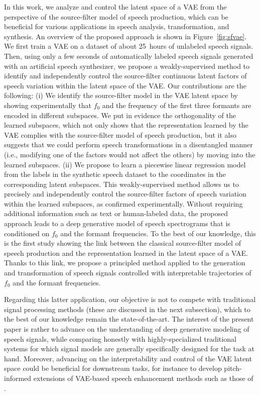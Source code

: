 \documentclass[review]{elsarticle}
\begin{document}
In this work, we analyze and control the latent space of a VAE from the perspective of the source-filter model of speech production, which can be beneficial for various applications in speech analysis, transformation, and synthesis. An overview of the proposed approach is shown in Figure~\ref{fig:sfvae}. We first train a VAE on a dataset of about 25~hours of unlabeled speech signals. Then, using only a few seconds of automatically labeled speech signals generated with an artificial speech synthesizer, we propose a weakly-supervised method to identify and independently control the source-filter continuous latent factors of speech variation within the latent space of the VAE. Our contributions are the following: (i) We identify the source-filter model in the VAE latent space by showing experimentally that $f_0$ and the frequency of the first three formants are encoded in different subspaces. We put in evidence the orthogonality of the learned subspaces, which not only shows that the representation learned by the VAE complies with the source-filter model of speech production, but it also suggests that we could perform speech transformations in a disentangled manner (i.e., modifying one of the factors would not affect the others) by moving into the learned subspaces. (ii) We propose to learn a piecewise linear regression model from the labels in the synthetic speech dataset to the coordinates in the corresponding latent subspaces. This weakly-supervised method allows us to precisely and independently control the source-filter factors of speech variation within the learned subspaces, as confirmed experimentally. Without requiring additional information such as text or human-labeled data, the proposed approach leads to a deep generative model of speech spectrograms that is conditioned on $f_0$ and the formant frequencies. To the best of our knowledge, this is the first study showing the link between the classical source-filter model of speech production and the representation learned in the latent space of a VAE. Thanks to this link, we propose a principled method applied to the generation and transformation of speech signals controlled with interpretable trajectories of $f_0$ and the formant frequencies.

Regarding this latter application, our objective is not to compete with traditional signal processing methods (these are discussed in the next subsection), which to the best of our knowledge remain the state-of-the-art. The interest of the present paper is rather to advance on the understanding of deep generative modeling of speech signals, while comparing honestly with highly-specialized traditional systems for which signal models are generally specifically designed for the task at hand. Moreover, advancing on the interpretability and control of the VAE latent space could be beneficial for downstream tasks, for instance to develop pitch-informed extensions of VAE-based speech enhancement methods such as those of \citet{bando2018statistical,leglaive_MLSP18, leglaive2020recurrent,bie2021unsupervised}.
\end{document}
